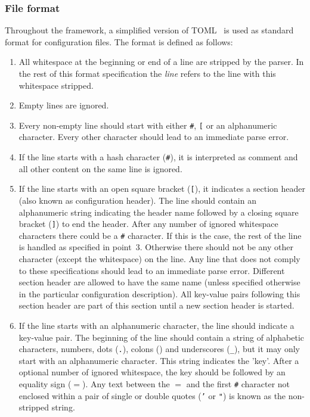 \subsubsection{File format}
\label{sec:config_file_format}
Throughout the framework, a simplified version of TOML~\cite{tomlgit} is used as standard format for configuration files.
The format is defined as follows:
\begin{enumerate}
\item All whitespace at the beginning or end of a line are stripped by the parser.
In the rest of this format specification the \textit{line} refers to the line with this whitespace stripped.
\item Empty lines are ignored.
\item Every non-empty line should start with either \texttt{\#}, \texttt{[} or an alphanumeric character.
Every other character should lead to an immediate parse error.
\item If the line starts with a hash character (\texttt{\#}), it is interpreted as comment and all other content on the same line is ignored.
\item If the line starts with an open square bracket (\texttt{[}), it indicates a section header (also known as configuration header).
The line should contain an alphanumeric string indicating the header name followed by a closing square bracket (\texttt{]}) to end the header.
After any number of ignored whitespace characters there could be a \texttt{\#} character.
If this is the case, the rest of the line is handled as specified in point~3.
Otherwise there should not be any other character (except the whitespace) on the line.
Any line that does not comply to these specifications should lead to an immediate parse error.
Different section header are allowed to have the same name (unless specified otherwise in the particular configuration description).
All key-value pairs following this section header are part of this section until a new section header is started.
\item If the line starts with an alphanumeric character, the line should indicate a key-value pair.
The beginning of the line should contain a string of alphabetic characters, numbers, dots (\texttt{.}), colons (\texttt{\:}) and underscores (\texttt{\_}), but it may only start with an alphanumeric character.
This string indicates the 'key'.
After a optional number of ignored whitespace, the key should be followed by an equality sign (\texttt{$=$}).
Any text between the \texttt{$=$} and the first \texttt{\#} character not enclosed within a pair of single or double quotes (\texttt{'} or \texttt{"}) is known as the non-stripped string.

\end{enumerate}
